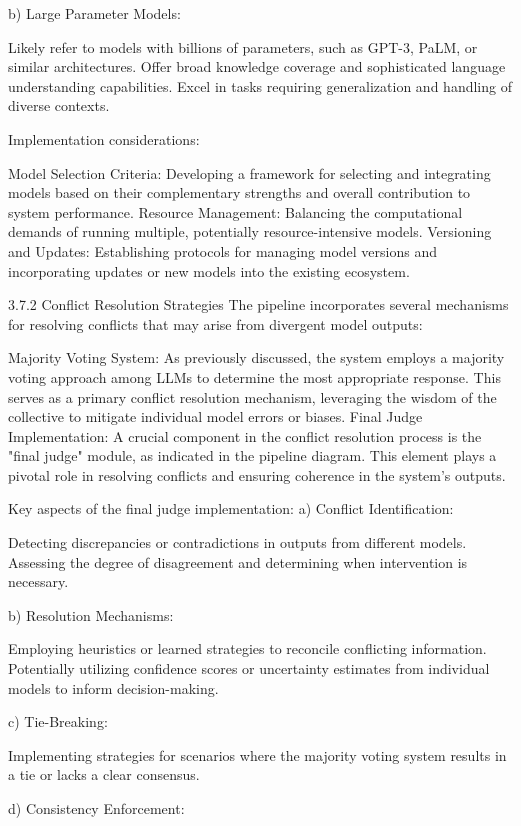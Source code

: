 b) Large Parameter Models:

Likely refer to models with billions of parameters, such as GPT-3, PaLM, or similar architectures.
Offer broad knowledge coverage and sophisticated language understanding capabilities.
Excel in tasks requiring generalization and handling of diverse contexts.

Implementation considerations:

Model Selection Criteria: Developing a framework for selecting and integrating models based on their complementary strengths and overall contribution to system performance.
Resource Management: Balancing the computational demands of running multiple, potentially resource-intensive models.
Versioning and Updates: Establishing protocols for managing model versions and incorporating updates or new models into the existing ecosystem.

3.7.2 Conflict Resolution Strategies
The pipeline incorporates several mechanisms for resolving conflicts that may arise from divergent model outputs:

Majority Voting System:
As previously discussed, the system employs a majority voting approach among LLMs to determine the most appropriate response. This serves as a primary conflict resolution mechanism, leveraging the wisdom of the collective to mitigate individual model errors or biases.
Final Judge Implementation:
A crucial component in the conflict resolution process is the "final judge" module, as indicated in the pipeline diagram. This element plays a pivotal role in resolving conflicts and ensuring coherence in the system's outputs.

Key aspects of the final judge implementation:
a) Conflict Identification:

Detecting discrepancies or contradictions in outputs from different models.
Assessing the degree of disagreement and determining when intervention is necessary.

b) Resolution Mechanisms:

Employing heuristics or learned strategies to reconcile conflicting information.
Potentially utilizing confidence scores or uncertainty estimates from individual models to inform decision-making.

c) Tie-Breaking:

Implementing strategies for scenarios where the majority voting system results in a tie or lacks a clear consensus.

d) Consistency Enforcement:

